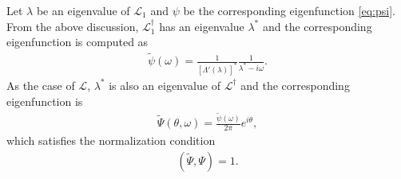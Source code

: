 Let $\lambda$ be an eigenvalue of $\mathcal{L}_{1}$
and $\psi$ be the corresponding eigenfunction \eqref{eq:psi}.
From the above discussion,
$\mathcal{L}_{1}^{\dagger}$ has an eigenvalue $\lambda^{\ast}$
and the corresponding eigenfunction is computed as
\begin{align}
  \widetilde{\psi}(\omega)
  = \frac{1}{[\Lambda'(\lambda)]^{\ast}} \frac{1}{\lambda^{\ast}-i\omega}.
  \label{eq:tildepsi}
\end{align}
As the case of $\mathcal{L}$,
$\lambda^{\ast}$ is also an eigenvalue of $\mathcal{L}^{\dagger}$
and the corresponding eigenfunction is
\begin{align}
  \widetilde{\Psi}(\theta,\omega)
  = \frac{\widetilde{\psi}(\omega)}{2\pi} e^{i\theta},
\end{align}
which satisfies the normalization condition
\begin{align}
  \left( \widetilde{\Psi}, \Psi \right) = 1.
  \label{eq:normalization-condition}
\end{align}



